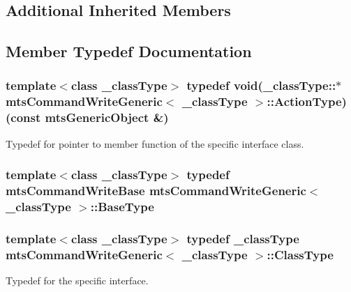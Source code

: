 \subsection*{Additional Inherited Members}


\subsection{Member Typedef Documentation}
\hypertarget{classmts_command_write_generic_aa941087c4b92213fe1b6b670f4ce5a36}{}
\subsubsection[{Action\+Type}]{\setlength{\rightskip}{0pt plus 5cm}template$<$class \+\_\+class\+Type$>$ typedef void(\+\_\+class\+Type\+::$\ast$ {\bf mts\+Command\+Write\+Generic}$<$ \+\_\+class\+Type $>$\+::Action\+Type) (const {\bf mts\+Generic\+Object} \&)}\label{classmts_command_write_generic_aa941087c4b92213fe1b6b670f4ce5a36}
Typedef for pointer to member function of the specific interface class. \hypertarget{classmts_command_write_generic_aa2dd1b534b1f880987ed8b47edbc6b8b}{}
\subsubsection[{Base\+Type}]{\setlength{\rightskip}{0pt plus 5cm}template$<$class \+\_\+class\+Type$>$ typedef {\bf mts\+Command\+Write\+Base} {\bf mts\+Command\+Write\+Generic}$<$ \+\_\+class\+Type $>$\+::{\bf Base\+Type}}\label{classmts_command_write_generic_aa2dd1b534b1f880987ed8b47edbc6b8b}
\hypertarget{classmts_command_write_generic_ab4ffe009b7558cff08d309ba7dfb1235}{}
\subsubsection[{Class\+Type}]{\setlength{\rightskip}{0pt plus 5cm}template$<$class \+\_\+class\+Type$>$ typedef \+\_\+class\+Type {\bf mts\+Command\+Write\+Generic}$<$ \+\_\+class\+Type $>$\+::{\bf Class\+Type}}\label{classmts_command_write_generic_ab4ffe009b7558cff08d309ba7dfb1235}
Typedef for the specific interface. \hypertarget{classmts_command_write_generic_adaaf201d0985787a45e6b4177f724972}{}
